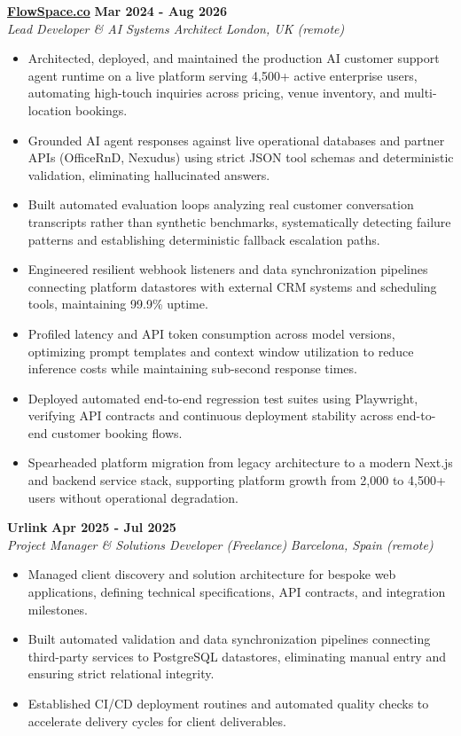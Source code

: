\documentclass[10pt,a4paper]{article}
\newcommand{\role}[4]{%
  \textbf{#1} \hfill \textbf{#2}\\[1pt]%
  \textit{#3} \hfill \textit{#4}\\[2pt]%
}
\begin{document}
\role{\href{https://flowspace.co}{FlowSpace.co}}{Mar 2024 - Aug 2026}{Lead Developer \& AI Systems Architect}{London, UK (remote)}
\begin{itemize}
  \item Architected, deployed, and maintained the production AI customer support agent runtime on a live platform serving 4,500+ active enterprise users, automating high-touch inquiries across pricing, venue inventory, and multi-location bookings.
  \item Grounded AI agent responses against live operational databases and partner APIs (OfficeRnD, Nexudus) using strict JSON tool schemas and deterministic validation, eliminating hallucinated answers.
  \item Built automated evaluation loops analyzing real customer conversation transcripts rather than synthetic benchmarks, systematically detecting failure patterns and establishing deterministic fallback escalation paths.
  \item Engineered resilient webhook listeners and data synchronization pipelines connecting platform datastores with external CRM systems and scheduling tools, maintaining 99.9\% uptime.
  \item Profiled latency and API token consumption across model versions, optimizing prompt templates and context window utilization to reduce inference costs while maintaining sub-second response times.
  \item Deployed automated end-to-end regression test suites using Playwright, verifying API contracts and continuous deployment stability across end-to-end customer booking flows.
  \item Spearheaded platform migration from legacy architecture to a modern Next.js and backend service stack, supporting platform growth from 2,000 to 4,500+ users without operational degradation.
\end{itemize}

\role{Urlink}{Apr 2025 - Jul 2025}{Project Manager \& Solutions Developer (Freelance)}{Barcelona, Spain (remote)}
\begin{itemize}
  \item Managed client discovery and solution architecture for bespoke web applications, defining technical specifications, API contracts, and integration milestones.
  \item Built automated validation and data synchronization pipelines connecting third-party services to PostgreSQL datastores, eliminating manual entry and ensuring strict relational integrity.
  \item Established CI/CD deployment routines and automated quality checks to accelerate delivery cycles for client deliverables.
\end{itemize}
\end{document}
